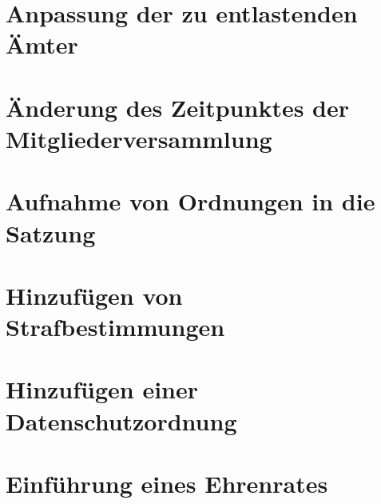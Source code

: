 \documentclass[10pt,a4paper,parskip=half]{scrartcl}
\begin{document}
  \section{Anpassung der zu entlastenden Ämter}
  \section{Änderung des Zeitpunktes der Mitgliederversammlung}
  \section{Aufnahme von Ordnungen in die Satzung}
  \section{Hinzufügen von Strafbestimmungen}
  \section{Hinzufügen einer Datenschutzordnung}
  \section{Einführung eines Ehrenrates}
  
\end{document}
